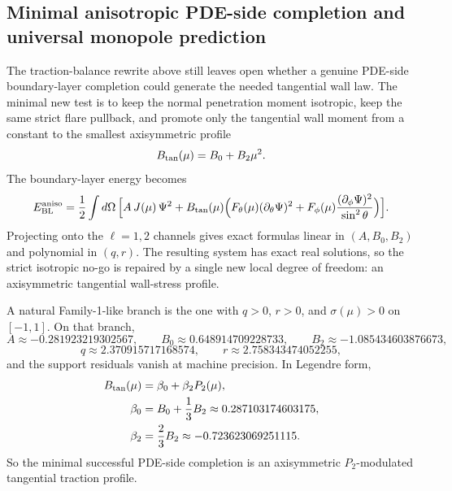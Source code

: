 \documentclass[11pt]{article}
\begin{document}
\subsection{Minimal anisotropic PDE-side completion and universal monopole prediction}
\label{app:family1-aniso}

The traction-balance rewrite above still leaves open whether a genuine PDE-side
boundary-layer completion could generate the needed tangential wall law.  The minimal new
test is to keep the normal penetration moment isotropic, keep the same strict flare
pullback, and promote only the tangential wall moment from a constant to the smallest
axisymmetric profile
\begin{equation}
B_{\rm tan}(\mu)=B_0+B_2\mu^2.
\label{eq:family1-Btan}
\end{equation}
The boundary-layer energy becomes
\begin{equation}
E_{\rm BL}^{\rm aniso}
=
\frac12\int d\Omega\,
\Big[
A\,J(\mu)\,\Psi^2
+
B_{\rm tan}(\mu)
\Big(
F_{\theta}(\mu)(\partial_{\theta}\Psi)^2
+
F_{\phi}(\mu)\frac{(\partial_{\phi}\Psi)^2}{\sin^2\theta}
\Big)
\Big].
\label{eq:family1-aniso-EBL}
\end{equation}
Projecting onto the \(\ell=1,2\) channels gives exact formulas linear in
\((A,B_0,B_2)\) and polynomial in \((q,r)\).  The resulting system has exact real
solutions, so the strict isotropic no-go is repaired by a single new local degree of
freedom: an axisymmetric tangential wall-stress profile.

A natural Family-1-like branch is the one with \(q>0\), \(r>0\), and
\(\sigma(\mu)>0\) on \([-1,1]\).  On that branch,
\begin{equation}
A\approx -0.281923219302567,
\qquad
B_0\approx 0.648914709228733,
\qquad
B_2\approx -1.085434603876673,
\label{eq:family1-familylike-branch-AB}
\end{equation}
\begin{equation}
q\approx 2.370915717168574,
\qquad
r\approx 2.758343474052255,
\label{eq:family1-familylike-branch-qr}
\end{equation}
and the support residuals vanish at machine precision.  In Legendre form,
\begin{equation}
\begin{aligned}
B_{\rm tan}(\mu)&=\beta_0+\beta_2 P_2(\mu),\\
\beta_0&=B_0+\frac13 B_2\approx 0.287103174603175,\\
\beta_2&=\frac23 B_2\approx -0.723623069251115.
\end{aligned}
\label{eq:family1-beta0-beta2}
\end{equation}
So the minimal successful PDE-side completion is an axisymmetric
\(P_2\)-modulated tangential traction profile.
\end{document}
